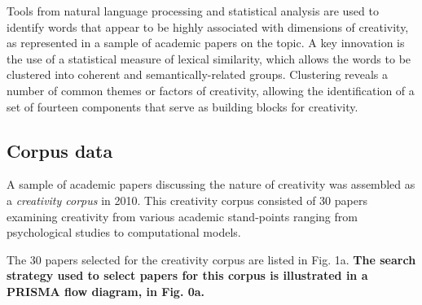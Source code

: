 \documentclass[10pt,letterpaper]{article}
\begin{document}
Tools from natural language processing and statistical analysis are used to identify words that appear to be highly associated with dimensions of creativity, as represented in a sample of academic papers on the topic. A key innovation is the use of a statistical measure of lexical similarity, which allows the words to be clustered into coherent and semantically-related groups. Clustering reveals a number of common themes or factors of creativity, allowing the identification of a set of fourteen components that serve as building blocks for creativity.

\subsection*{Corpus data}\label{corpusData}

A sample of academic papers discussing the nature of creativity was assembled as a {\em creativity corpus\/} in 2010. This creativity corpus consisted of 30 papers examining creativity from various academic stand-points ranging from psychological studies to computational models. 

\vspace{0.25cm}
\begin{center}
\end{center}
\vspace{0.25cm}

The 30 papers selected for the creativity corpus are listed in Fig. 1a. %
\textbf{The search strategy used to select papers for this corpus is illustrated in a PRISMA \cite{prisma09} flow diagram, in Fig. 0a.} %

\end{document}
